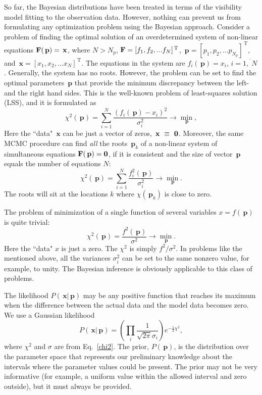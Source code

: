 \documentclass[preprint2]{aastex}
\newcommand{\bfp}{\,\mathbf{p}}
\newcommand{\bfx}{\,\mathbf{x}}
\newcommand{\uT}{\,\mathrm{T}}
\begin{document}
So far, the Bayesian distributions have been treated in terms of the visibility model fitting to the observation data. However, nothing can prevent us from formulating any optimization problem using the Bayesian approach. Consider a problem of finding the optimal solution of an overdetermined system of non-linear equations ${\bf F}(\bfp) = \bfx$, where $N > N_p$, ${\bf F} = [f_1, f_2, ... f_N]^{\uT}$, $\bfp = [p_1, p_2, ... p_{N_p}]^{\uT}$, and $\bfx = [x_1, x_2, ... x_N]^{\uT}$. The equations in the system are $f_i(\bfp) = x_i$, $i = \overline{1,\;N}$. Generally, the system has no roots. However, the problem can be set to find the optimal parameters $\bfp$ that provide the minimum discrepancy between the left- and the right hand sides. This is the well-known problem of least-squares solution (LSS), and it is formulated as   
\begin{equation}
  \label{vector_optimization_problem}
  \chi^2(\bfp) = \sum_{i=1}^{N} \frac{(f_i(\bfp) - x_i)^2}{\sigma_i^2}  \rightarrow {\min\limits_{\bfp}},
\end{equation}
Here the ``data" $\bfx$ can be just a vector of zeros, $\bfx~\equiv~{\bf 0}$. Moreover, the same MCMC procedure can find \emph{all} the roots $\bfp_k$ of a non-linear system of simultaneous equations ${\bf F}(\bfp) = {\bf 0}$, if it is consistent and the size of vector $\bfp$ equals the number of equations $N$:
\begin{equation}
  \label{vector_optimization_problem}
  \chi^2(\bfp) = \sum_{i=1}^{N} \frac{f_i^2(\bfp)}{\sigma_i^2}  \rightarrow {\min\limits_{\bfp}}.
\end{equation}
The roots will sit at the locations $k$ where $\chi(\bfp_k)$ is close to zero.

The problem of minimization of a single function of several variables $x = f(\bfp)$ is quite trivial:
\begin{equation}
  \label{optimization_problem}
  \chi^2(\bfp) =  \frac{f^2(\bfp)}{\sigma^2} \rightarrow {\min\limits_{\bfp}}.
\end{equation}
Here the ``data" $x$ is just a zero. The $\chi^2$ is simply $f^2/\sigma^2$. In problems like the mentioned above, all the variances $\sigma_i^2$ can be set to the same nonzero value, for example, to unity. The Bayesian inference is obviously applicable to this class of problems.


The likelihood $P(\bfx|\bfp)$ may be any positive function that reaches its maximum when the difference between the actual data and the model data becomes zero. We use a Gaussian likelihood
\begin{equation}
  \label{gaussian_likelihood}
  P(\bfx|\bfp) = \left(\prod_i \frac{1}{\sqrt{2 \pi} \sigma_i} \right) e^{-\frac{1}{2}\chi^2},
\end{equation}
where $\chi^2$ and $\sigma$ are from Eq.~\eqref{chi2}.
The prior, $P(\bfp)$, is the distribution over the parameter space that represents our preliminary knowledge about the intervals where the parameter values could be present.
The prior may not be very informative (for example, a uniform value within the allowed interval and zero outside), but it must always be provided.  
\end{document}
